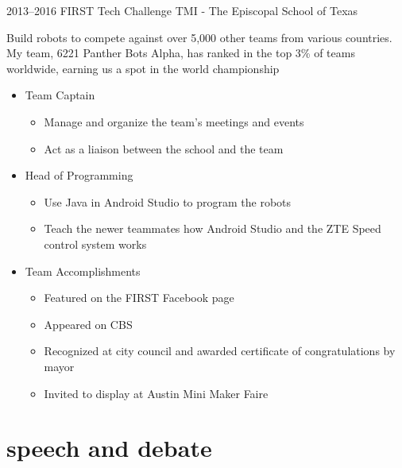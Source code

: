 \documentclass[]{friggeri-cv} %
\begin{document}
\begin{entrylist}
	\entry
	{2013--2016}
	{FIRST Tech Challenge}
	{TMI - The Episcopal School of Texas}
	{Build robots to compete against over 5,000 other teams from various countries. My team, 6221 Panther Bots Alpha, has ranked in the top 3\% of teams worldwide, earning us a spot in the world championship
		\begin{itemize}
			\item Team Captain
				\begin{itemize}
					\item Manage and organize the team's meetings and events
					\item Act as a liaison between the school and the team
				\end{itemize}
			\item Head of Programming
				\begin{itemize}
					\item Use Java in Android Studio to program the robots
					\item Teach the newer teammates how Android Studio and the ZTE Speed control system works
				\end{itemize}
		\end{itemize}
		\begin{itemize}
			\item Team Accomplishments
				\begin{itemize}
					\item Featured on the FIRST Facebook page
					\item Appeared on CBS
					\item Recognized at city council and awarded certificate of congratulations by mayor
					\item Invited to display at Austin Mini Maker Faire
				\end{itemize}
		\end{itemize}
	}

\end{entrylist}


\section{speech and debate}
\end{document}
